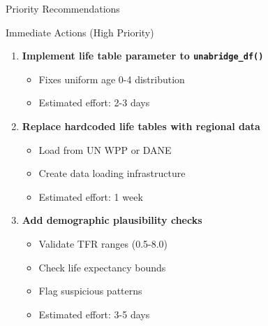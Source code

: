 \documentclass[aspectratio=169]{beamer}
\begin{document}
\begin{frame}{Priority Recommendations}
\begin{block}{Immediate Actions (High Priority)}
\begin{enumerate}
    \item \textbf{Implement life table parameter to \texttt{unabridge\_df()}}
    \begin{itemize}
        \item Fixes uniform age 0-4 distribution
        \item Estimated effort: 2-3 days
    \end{itemize}
    
    \item \textbf{Replace hardcoded life tables with regional data}
    \begin{itemize}
        \item Load from UN WPP or DANE
        \item Create data loading infrastructure
        \item Estimated effort: 1 week
    \end{itemize}
    
    \item \textbf{Add demographic plausibility checks}
    \begin{itemize}
        \item Validate TFR ranges (0.5-8.0)
        \item Check life expectancy bounds
        \item Flag suspicious patterns
        \item Estimated effort: 3-5 days
    \end{itemize}
\end{enumerate}
\end{block}
\end{frame}
\end{document}
